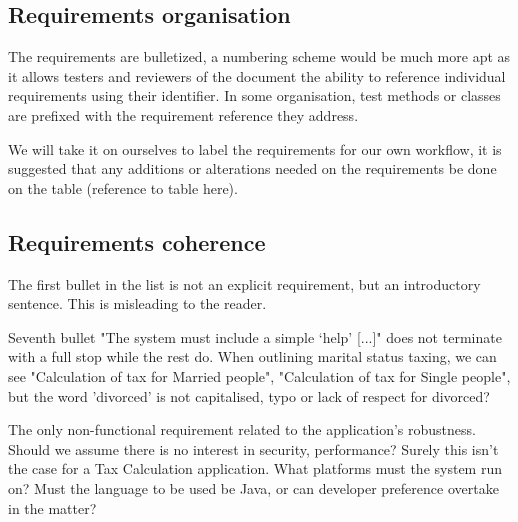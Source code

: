 \subsection{Requirements organisation}
The requirements are bulletized, a numbering scheme would be much more apt as it allows testers and reviewers of the document the ability to reference individual requirements using their identifier. In some organisation, test methods or classes are prefixed with the requirement reference they address. 

We will take it on ourselves to label the requirements for our own workflow, it is suggested that any additions or alterations needed on the requirements be done on the table (reference to table here).

\subsection{Requirements coherence}

The first bullet in the list is not an explicit requirement, but an introductory sentence. This is misleading to the reader. 

Seventh bullet "The system must include a simple ‘help’ [...]" does not terminate with a full stop while the rest do. 
When outlining marital status taxing, we can see "Calculation of tax for Married people", "Calculation of tax for Single people", but the word 'divorced' is not capitalised, typo or lack of respect for divorced?  

The only non-functional requirement related to the application's robustness. Should we assume there is no interest in security, performance? Surely this isn't the case for a Tax Calculation application. What platforms must the system run on? Must the language to be used be Java, or can developer preference overtake in the matter? 
\par


